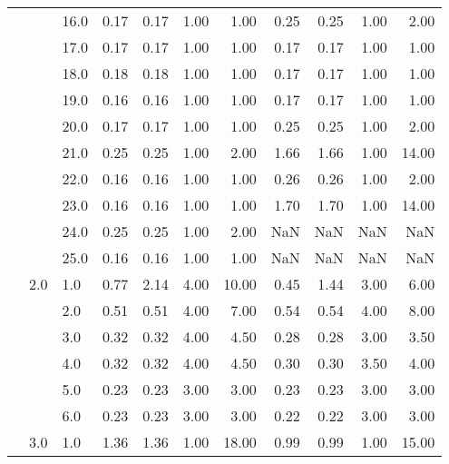\begin{tabular}{lllrrrrrrrr}
       &     & 16.0 &       0.17 &      0.17 & 1.00 &   1.00 &       0.25 &      0.25 & 1.00 &   2.00 \\
       &     & 17.0 &       0.17 &      0.17 & 1.00 &   1.00 &       0.17 &      0.17 & 1.00 &   1.00 \\
       &     & 18.0 &       0.18 &      0.18 & 1.00 &   1.00 &       0.17 &      0.17 & 1.00 &   1.00 \\
       &     & 19.0 &       0.16 &      0.16 & 1.00 &   1.00 &       0.17 &      0.17 & 1.00 &   1.00 \\
       &     & 20.0 &       0.17 &      0.17 & 1.00 &   1.00 &       0.25 &      0.25 & 1.00 &   2.00 \\
       &     & 21.0 &       0.25 &      0.25 & 1.00 &   2.00 &       1.66 &      1.66 & 1.00 &  14.00 \\
       &     & 22.0 &       0.16 &      0.16 & 1.00 &   1.00 &       0.26 &      0.26 & 1.00 &   2.00 \\
       &     & 23.0 &       0.16 &      0.16 & 1.00 &   1.00 &       1.70 &      1.70 & 1.00 &  14.00 \\
       &     & 24.0 &       0.25 &      0.25 & 1.00 &   2.00 &        NaN &       NaN &  NaN &    NaN \\
       &     & 25.0 &       0.16 &      0.16 & 1.00 &   1.00 &        NaN &       NaN &  NaN &    NaN \\
       & 2.0 & 1.0  &       0.77 &      2.14 & 4.00 &  10.00 &       0.45 &      1.44 & 3.00 &   6.00 \\
       &     & 2.0  &       0.51 &      0.51 & 4.00 &   7.00 &       0.54 &      0.54 & 4.00 &   8.00 \\
       &     & 3.0  &       0.32 &      0.32 & 4.00 &   4.50 &       0.28 &      0.28 & 3.00 &   3.50 \\
       &     & 4.0  &       0.32 &      0.32 & 4.00 &   4.50 &       0.30 &      0.30 & 3.50 &   4.00 \\
       &     & 5.0  &       0.23 &      0.23 & 3.00 &   3.00 &       0.23 &      0.23 & 3.00 &   3.00 \\
       &     & 6.0  &       0.23 &      0.23 & 3.00 &   3.00 &       0.22 &      0.22 & 3.00 &   3.00 \\
       & 3.0 & 1.0  &       1.36 &      1.36 & 1.00 &  18.00 &       0.99 &      0.99 & 1.00 &  15.00 \\
\bottomrule
\end{tabular}
